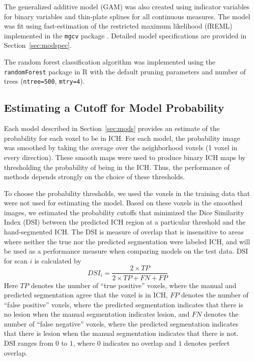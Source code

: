 \documentclass{elsarticle_nonatbib}\usepackage[]{graphicx}\usepackage[]{color}
\newcommand{\pkg}[1]{\texttt{#1}}
\newcommand{\code}[1]{\texttt{#1}}
\begin{document}
The generalized additive model (GAM) \citep{hastie_generalized_1986, hastie_generalized_1990} was also created using indicator variables for binary variables and thin-plate splines for all continuous measures. The model was fit using fast-estimation of the restricted maximum likelihood (fREML) implemented in the \pkg{mgcv} package \citep{wood_fast_2011, wood_generalized_2015}.   Detailed model specifications are provided in Section~\ref{sec:modspec}.


The random forest \citep{breiman2001random} classification algorithm was implemented using the \pkg{randomForest} package in R \citep{randomForest} with the default pruning parameters and number of trees (\code{ntree=500}, \code{mtry=4}). 



\subsection{Estimating a Cutoff for Model Probability}
\label{sec:cutoffs}
Each model described in Section~\ref{sec:mods} provides an estimate of the probability for each voxel to be in ICH.  For each model, the probability image was smoothed by taking the average over the neighborhood voxels (1 voxel in every direction).  These smooth maps were used to produce binary ICH maps by thresholding the probability of being in the ICH. Thus, the performance of methods depends strongly on the choice of these thresholds.

To choose the probability thresholds, we used the voxels in the training data that were not used for estimating the model.  Based on these voxels in the smoothed images, we estimated the probability cutoffs that minimized the Dice Similarity Index (DSI) \citep{dice_measures_1945} between the predicted ICH region at a particular threshold and the hand-segmented ICH.  
 The DSI is measure of overlap that is insensitive to areas where neither the true nor the predicted segmentation were labeled ICH, and will be used as a performance measure when comparing models on the test data.  DSI for scan $i$ is calculated by 
 $$
 DSI_i = \frac{2 \times TP}{2\times TP + FN + FP}
 $$
Here $TP$ denotes the number of ``true positive'' voxels, where the manual and predicted segmentation 
agree that the voxel is in ICH, $FP$ denotes the number of ``false positive'' voxels, where the predicted segmentation indicates that there is no lesion when the manual segmentation indicates lesion, and $FN$ denotes the number of ``false negative'' voxels, where the predicted segmentation indicates that there is lesion when the manual segmentation indicates that there is not. DSI ranges from $0$ to $1$, where $0$ indicates no overlap and $1$ denotes perfect overlap.
\end{document}
